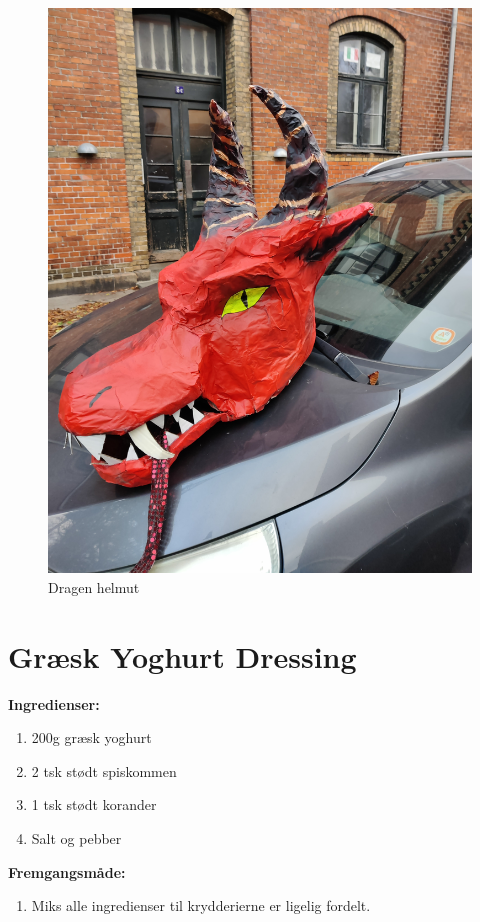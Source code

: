 \documentclass{book}
\begin{document}
\begin{figure}
    \centering
    \includegraphics[width=0.5\linewidth]{Helmut.jpg}
    \caption{Dragen helmut}
  
\end{figure}
\newpage \section{Græsk Yoghurt Dressing}
\begin{minipage}[t]{0.5\textwidth}
\textbf{Ingredienser:}
 \begin{enumerate}
        \item 200g græsk yoghurt 
        \item 2 tsk stødt spiskommen
        \item 1 tsk stødt korander
        \item Salt og pebber
    \end{enumerate}
\end{minipage}
\begin{minipage}[t]{0.5\textwidth}
\textbf{Fremgangsmåde:}
\begin{enumerate}
    \item Miks alle ingredienser til krydderierne er ligelig fordelt.
\end{enumerate}
\end{minipage}
\newpage 
\end{document}

